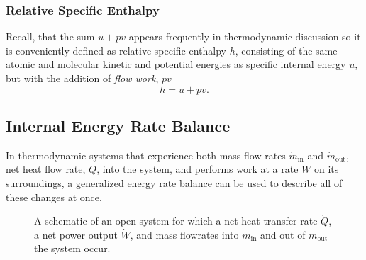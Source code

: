 \subsubsection{Relative Specific Enthalpy}
Recall, that the sum $u+pv$ appears frequently in thermodynamic discussion so it is conveniently defined as relative specific enthalpy $h$, consisting of the same atomic and molecular kinetic and potential energies as specific internal energy $u$, but with the addition of \emph{flow work}, $pv$
\begin{equation}
\label{eqn:RelativeEnthalpy}
h=u+pv.
\end{equation}

\subsection{Internal Energy Rate Balance}
In thermodynamic systems that experience both mass flow rates $\dot{m}_{\text{in}}$ and $\dot{m}_{\text{out}}$, net heat flow rate, $\dot{Q}$, into the system, and performs work at a rate $\dot{W}$ on its surroundings, a generalized energy rate balance can be used to describe all of these changes at once.
\begin{figure}[h]
\begin{center}
\end{center}
\caption{A schematic of an open system for which a net heat transfer rate $\dot{Q}$, a net power output $\dot{W}$, and mass flowrates into $\dot{m}_{\text{in}}$ and out of $\dot{m}_{\text{out}}$ the system occur.} \label{fig:OpenSystemQW}
\end{figure}
\vspace{12pt}

